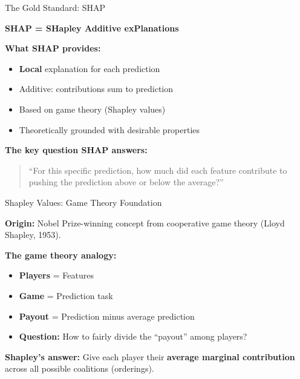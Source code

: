 \documentclass[10pt]{beamer}
\newcommand{\highlight}[1]{\textcolor{AccentOrange}{\textbf{#1}}}
\begin{document}
\begin{frame}{The Gold Standard: SHAP}

  \textbf{SHAP = SHapley Additive exPlanations}

  \vspace{1em}
  \textbf{What SHAP provides:}
  \begin{itemize}
    \item \highlight{Local} explanation for each prediction
    \item Additive: contributions sum to prediction
    \item Based on game theory (Shapley values)
    \item Theoretically grounded with desirable properties
  \end{itemize}

  \vspace{1em}
  \textbf{The key question SHAP answers:}

  \vspace{0.3em}
  \begin{quote}
    ``For this specific prediction, how much did each feature contribute to pushing the prediction above or below the average?''
  \end{quote}
\end{frame}


\begin{frame}{Shapley Values: Game Theory Foundation}

  \textbf{Origin:} Nobel Prize-winning concept from cooperative game theory (Lloyd Shapley, 1953).

  \vspace{1em}
  \textbf{The game theory analogy:}
  \begin{itemize}
    \item \textbf{Players} = Features
    \item \textbf{Game} = Prediction task
    \item \textbf{Payout} = Prediction minus average prediction
    \item \textbf{Question:} How to fairly divide the ``payout'' among players?
  \end{itemize}

  \vspace{1em}
  \textbf{Shapley's answer:} Give each player their \highlight{average marginal contribution} across all possible coalitions (orderings).
\end{frame}
\end{document}
